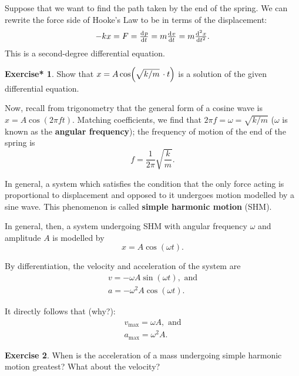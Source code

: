 \documentclass[a4paper]{amsbook}
\newcommand{\marginsymbol}{}
\theoremstyle{definition}
\newtheorem{exercise}{Exercise}
\numberwithin{exercise}{chapter}
\newtheorem{exercise*}[exercise]{Exercise*}
\numberwithin{exercise}{chapter}
\begin{document}
\marginsymbol Suppose that we want to find the path taken by the end of the spring. We can rewrite the force side of Hooke's Law to be
in terms of the displacement:
\begin{displaymath}
  -kx = F = \od{p}{t} = m \od{v}{t} = m\od[2]{x}{t}.
\end{displaymath}
This is a second-degree differential equation.

\begin{exercise*}
  Show that $ x = A \cos(\sqrt{k/m} \thinspace\cdot t) $ is a solution of the given differential equation.
\end{exercise*}

Now, recall from trigonometry that the general form of a cosine wave is $ x = A \cos(2\pi f t) $. Matching coefficients,
we find that $ 2\pi f = \omega = \sqrt{k/m} $ ($ \omega $ is known as the \textbf{angular frequency}); the frequency of
motion of the end of the spring is
\begin{equation}
  f = \frac{1}{2\pi} \sqrt{\frac{k}{m}}.
\end{equation}

In general, a system which satisfies the condition that the only force acting is proportional to displacement and opposed to
it undergoes motion modelled by a sine wave. This phenomenon is called \textbf{simple harmonic motion} (SHM).

In general, then, a system undergoing SHM with angular frequency $ \omega $ and amplitude $ A $ is modelled by
\begin{equation}
  x = A \cos (\omega t).
\end{equation}

By differentiation, the velocity and acceleration of the system are
\begin{gather}
  v = -\omega A \sin (\omega t), \text{ and}\\
  a = -\omega^2 A \cos (\omega t).
\end{gather}

It directly follows that (why?):
\begin{gather}
  v_\text{max} = \omega A, \text{ and}\\
  a_\text{max} = \omega^2 A.
\end{gather}

\begin{exercise}
  When is the acceleration of a mass undergoing simple harmonic motion greatest? What about the velocity?
\end{exercise}
\end{document}
